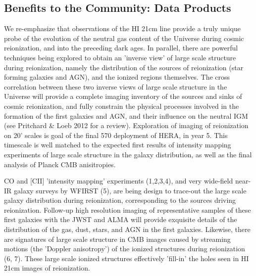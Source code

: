 \documentclass[preprint]{aastex}
\begin{document}
%
%

\subsection{Benefits to the Community: Data Products}

We re-emphasize that observations of the HI 21cm line provide a truly unique probe of the evolution of the neutral gas content of the Universe during cosmic reionization, and into the preceding dark ages. In parallel, there are powerful techniques being explored to obtain an 'inverse view' of large scale structure during reionization, namely the distribution of the sources of reionization (star forming galaxies and AGN), and the ionized regions themselves.  The cross correlation between these two inverse views of large scale structure in the Universe will provide a complete imaging inventory of the sources and sinks of cosmic reionization, and fully constrain the physical processes involved in the formation of the first galaxies and AGN, and their influence on the neutral IGM (see Pritchard \& Loeb 2012 for a review).  Exploration of imaging of reionization on 20' scales is goal of the final 570 deployment of HERA, in year 5. This timescale is well matched to the expected first results of intensity mapping experiments of large scale structure in the galaxy distribution, as well as the final analysis of Planck  CMB anisitropies. 

CO and [CII] 'intensity mapping' experiments (1,2,3,4), and very wide-field near-IR galaxy surveys by WFIRST (5), are being design to trace-out the large scale galaxy distribution during reionization, corresponding to the sources driving reionization. Follow-up high resolution imaging of representative samples of these first galaxies with the JWST and ALMA will provide exquisite details of the distribution of the gas, dust, stars, and AGN in the first galaxies. Likewise, there are signatures of large scale structure in CMB images caused by streaming motions (the 'Doppler anisotropy') of the ionized structures during reionization (6, 7). These large scale ionized structures effectively 'fill-in' the holes seen in HI 21cm images of reionization. 
\end{document}
